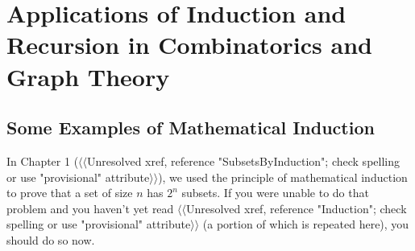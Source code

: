 \documentclass[10pt,]{book}
\theoremstyle{plain}
\theoremstyle{definition}
\numberwithin{equation}{chapter}
\begin{document}
\chapter[{Applications of Induction and Recursion in Combinatorics and Graph Theory}]{Applications of Induction and Recursion in Combinatorics and Graph Theory}\label{InductionRecursion}
\typeout{************************************************}
\typeout{************************************************}
\section[{Some Examples of Mathematical Induction}]{Some Examples of Mathematical Induction}\label{sec_induction-examples}
\typeout{************************************************}
\typeout{************************************************}
In Chapter 1 ({$\langle\langle$Unresolved xref, reference "SubsetsByInduction"; check spelling or use "provisional" attribute$\rangle\rangle$}), we used the principle of mathematical induction to prove that a set of size \(n\) has \(2^n\) subsets. If you were unable to do that problem and you haven't yet read {$\langle\langle$Unresolved xref, reference "Induction"; check spelling or use "provisional" attribute$\rangle\rangle$} (a portion of which is repeated here), you should do so now.%
\typeout{************************************************}
\typeout{************************************************}
\end{document}
